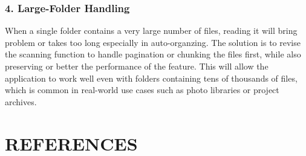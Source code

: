\documentclass[12pt,oneside,openright,a4paper]{cpe-english-project}
\begin{document}
\subsection*{4. Large-Folder Handling}
When a single folder contains a very large number of files, reading it will bring problem or takes too long especially in auto-organzing. The solution is to revise the scanning function to handle pagination or chunking the files first, while also preserving or better the performance of the feature. This will allow the application to work well even with folders containing tens of thousands of files, which is common in real-world use cases such as photo libraries or project archives.

\chapter*{REFERENCES}
\end{document}
